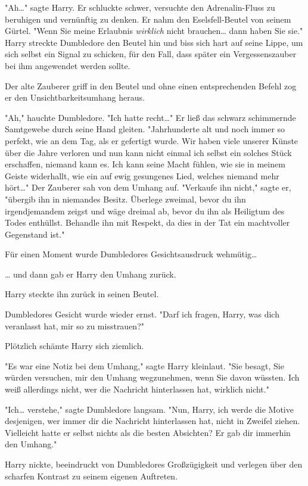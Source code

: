 {"Ah…" sagte Harry. Er schluckte schwer, versuchte den Adrenalin-Fluss zu beruhigen und vernünftig zu denken. Er nahm den Eselsfell-Beutel von seinem Gürtel. "Wenn Sie meine Erlaubnis \emph{wirklich} nicht brauchen… dann haben Sie sie." Harry streckte Dumbledore den Beutel hin und biss sich hart auf seine Lippe, um sich selbst ein Signal zu schicken, für den Fall, dass später ein Vergessenszauber bei ihm angewendet werden sollte.

Der alte Zauberer griff in den Beutel und ohne einen entsprechenden Befehl zog er den Unsichtbarkeitsumhang heraus.

"Ah," hauchte Dumbledore. "Ich hatte recht…" Er ließ das schwarz schimmernde Samtgewebe durch seine Hand gleiten. "Jahrhunderte alt und noch immer so perfekt, wie an dem Tag, als er gefertigt wurde. Wir haben viele unserer Künste über die Jahre verloren und nun kann nicht einmal ich selbst ein solches Stück erschaffen, niemand kann es. Ich kann seine Macht fühlen, wie sie in meinem Geiste widerhallt, wie ein auf ewig gesungenes Lied, welches niemand mehr hört…" Der Zauberer sah von dem Umhang auf. "Verkaufe ihn nicht," sagte er, "übergib ihn in niemandes Besitz. Überlege zweimal, bevor du ihn irgendjemandem zeigst und wäge dreimal ab, bevor du ihn als Heiligtum des Todes enthüllst. Behandle ihn mit Respekt, da dies in der Tat ein machtvoller Gegenstand ist."

Für einen Moment wurde Dumbledores Gesichtsausdruck wehmütig…

… und dann gab er Harry den Umhang zurück.

Harry steckte ihn zurück in seinen Beutel.

Dumbledores Gesicht wurde wieder ernst. "Darf ich fragen, Harry, was dich veranlasst hat, mir so zu misstrauen?"

Plötzlich schämte Harry sich ziemlich.

"Es war eine Notiz bei dem Umhang," sagte Harry kleinlaut. "Sie besagt, Sie würden versuchen, mir den Umhang wegzunehmen, wenn Sie davon wüssten. Ich weiß allerdings nicht, wer die Nachricht hinterlassen hat, wirklich nicht."

"Ich… verstehe," sagte Dumbledore langsam. "Nun, Harry, ich werde die Motive desjenigen, wer immer dir die Nachricht hinterlassen hat, nicht in Zweifel ziehen. Vielleicht hatte er selbst nichts als die besten Absichten? Er gab dir immerhin den Umhang."

Harry nickte, beeindruckt von Dumbledores Großzügigkeit und verlegen über den scharfen Kontrast zu seinem eigenen Auftreten.

}
